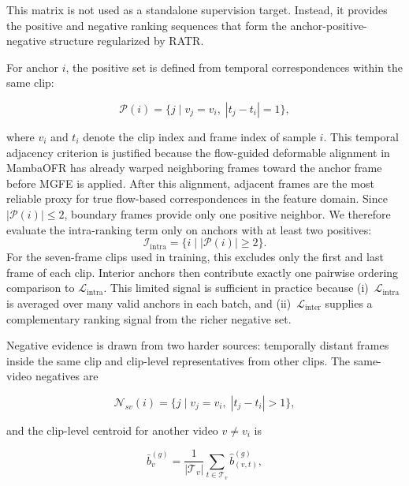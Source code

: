 This matrix is not used as a standalone supervision target. Instead, it provides the positive and negative ranking sequences that form the anchor-positive-negative structure regularized by RATR.

For anchor $i$, the positive set is defined from temporal correspondences within the same clip:

\begin{equation}
\mathcal{P}(i)=
\bigl\{
j \mid v_j=v_i,\;
|t_j-t_i|=1
\bigr\},
\end{equation}

where $v_i$ and $t_i$ denote the clip index and frame index of sample $i$. This temporal adjacency criterion is justified because the flow-guided deformable alignment in MambaOFR has already warped neighboring frames toward the anchor frame before MGFE is applied. After this alignment, adjacent frames are the most reliable proxy for true flow-based correspondences in the feature domain. Since $|\mathcal{P}(i)| \le 2$, boundary frames provide only one positive neighbor. We therefore evaluate the intra-ranking term only on anchors with at least two positives:
\begin{equation}
\mathcal{I}_{\text{intra}}=
\bigl\{
i \mid |\mathcal{P}(i)| \ge 2
\bigr\}.
\end{equation}
For the seven-frame clips used in training, this excludes only the first and last frame of each clip. Interior anchors then contribute exactly one pairwise ordering comparison to $\mathcal{L}_{\text{intra}}$. This limited signal is sufficient in practice because (i)~$\mathcal{L}_{\text{intra}}$ is averaged over many valid anchors in each batch, and (ii)~$\mathcal{L}_{\text{inter}}$ supplies a complementary ranking signal from the richer negative set.

Negative evidence is drawn from two harder sources: temporally distant frames inside the same clip and clip-level representatives from other clips. The same-video negatives are

\begin{equation}
\mathcal{N}_{sv}(i)=
\bigl\{
j \mid v_j=v_i,\;
|t_j-t_i|>1
\bigr\},
\end{equation}

and the clip-level centroid for another video $v\neq v_i$ is

\begin{equation}
\bar{b}_{v}^{(g)} =
\frac{1}{|\mathcal{T}_v|}
\sum_{t\in\mathcal{T}_v}
\widehat{b}_{(v,t)}^{(g)},
\end{equation}

